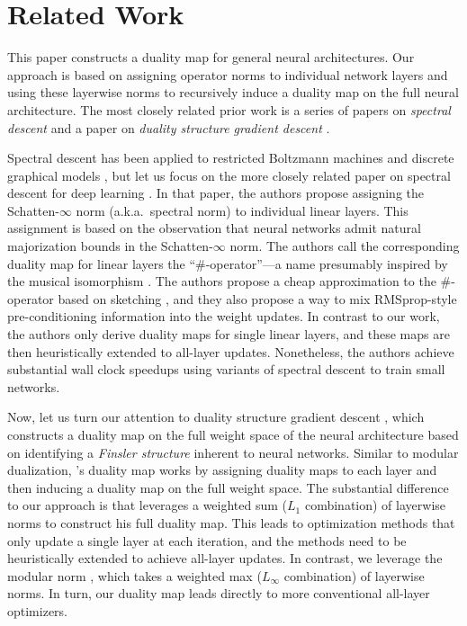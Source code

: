 \section{Related Work}

This paper constructs a duality map for general neural architectures. Our approach is based on assigning operator norms to individual network layers and using these layerwise norms to recursively induce a duality map on the full neural architecture. The most closely related prior work is a series of papers on \textit{spectral descent} \citep{spectral-descent-2,spectral-descent-4,spectral-descent-1} and a paper on \textit{duality structure gradient descent}  \citep{flynn2017duality}.

Spectral descent has been applied to restricted Boltzmann machines \citep{spectral-descent-2} and discrete graphical models \citep{spectral-descent-1}, but let us focus on the more closely related paper on spectral descent for deep learning \citep{spectral-descent-4}. In that paper, the authors propose assigning the Schatten-$\infty$ norm (a.k.a.\ spectral norm) to individual linear layers. This assignment is based on the observation that neural networks admit natural majorization bounds in the Schatten-$\infty$ norm. The authors call the corresponding duality map for linear layers the ``\#-operator''---a name presumably inspired by the musical isomorphism \citep{grosse2022metrics}. The authors propose a cheap approximation to the \#-operator based on sketching \citep{Martinsson_Tropp_2020}, and they also propose a way to mix RMSprop-style pre-conditioning information \citep{tieleman_rmsprop_2012} into the weight updates. In contrast to our work, the authors only derive duality maps for single linear layers, and these maps are then heuristically extended to all-layer updates. Nonetheless, the authors achieve substantial wall clock speedups using variants of spectral descent to train small networks.

Now, let us turn our attention to duality structure gradient descent \citep{flynn2017duality}, which constructs a duality map on the full weight space of the neural architecture based on identifying a \textit{Finsler structure} \citep{deimling1985nonlinear} inherent to neural networks. Similar to modular dualization, \citet{flynn2017duality}'s duality map works by assigning duality maps to each layer and then inducing a duality map on the full weight space. The substantial difference to our approach is that \citet{flynn2017duality} leverages a weighted sum ($L_1$ combination) of layerwise norms to construct his full duality map. This leads to optimization methods that only update a single layer at each iteration, and the methods need to be heuristically extended to achieve all-layer updates. In contrast, we leverage the modular norm \citep{modula}, which takes a weighted max ($L_\infty$ combination) of layerwise norms. In turn, our duality map leads directly to more conventional 
all-layer optimizers.

